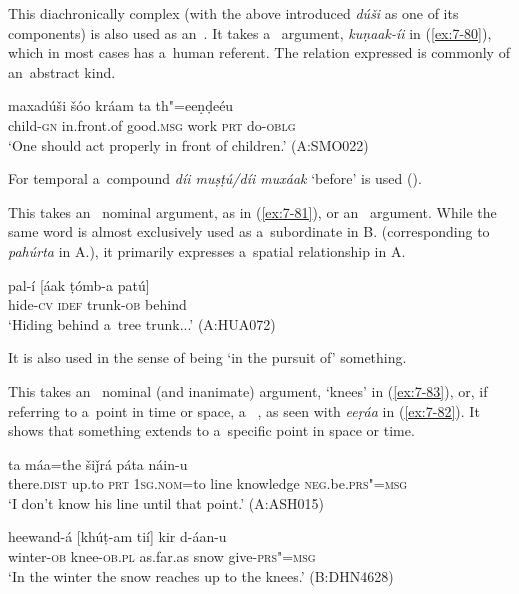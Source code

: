  This diachronically complex  (with the above introduced \textit{dúši} as one of its components) is also used as an~. It takes a~ argument, \textit{kuṇaak-íi} in (\ref{ex:7-80}), which in most cases has a~human referent. The relation expressed is commonly of an~abstract kind.

\begin{exe}
\ex
\label{ex:7-80}
\gll [kuṇaak-íi] maxadúši šóo kráam ta th"=eeṇḍeéu \\
child-\textsc{gn}  in.front.of good.\textsc{msg} work \textsc{prt} do-\textsc{oblg} \\
\glt `One should act properly in front of children.' (A:SMO022)
\end{exe}

For temporal  a~compound  \textit{díi muṣṭú/díi muxáak} `before' is used ().


 This  takes an~ nominal argument, as in (\ref{ex:7-81}), or an~  argument. While the same word is almost exclusively used as a~subordinate  in B. (corresponding to \textit{pahúrta} in A.), it primarily expresses a~spatial relationship in A. 

\begin{exe}
\ex
\label{ex:7-81}
\gll pal-í [áak ṭómb-a patú] \\
hide-\textsc{cv} \textsc{idef} trunk-\textsc{ob} behind \\
\glt `Hiding behind a~tree trunk...' (A:HUA072)
\end{exe}

It is also used in the sense of being `in the pursuit of' something.


 This  takes an~ nominal (and inanimate) argument, `knees' in (\ref{ex:7-83}), or, if referring to a~point in time or space, a~ , as seen with \textit{eeṛáa} in (\ref{ex:7-82}). It shows that something extends to a~specific point in space or time. 

\begin{exe}
\ex
\label{ex:7-82}
 ta máa=the šiǰrá páta náin-u \\
there.\textsc{dist} up.to \textsc{prt} \textsc{1sg.nom}=to line knowledge \textsc{neg}.be.\textsc{prs"=msg} \\
\glt `I don't know his line until that point.' (A:ASH015)
\end{exe}
\begin{exe}
\ex
\label{ex:7-83}
\gll heewand-á [khúṭ-am tií] kir d-áan-u \\
winter-\textsc{ob} knee-\textsc{ob.pl} as.far.as snow give-\textsc{prs"=msg}  \\
\glt `In the winter the snow reaches up to the knees.' (B:DHN4628)
\end{exe}

